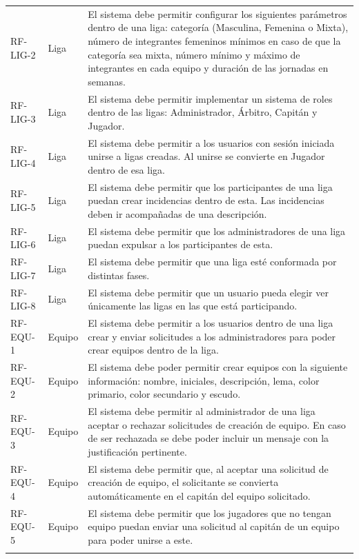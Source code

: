 {\begin{xltabular}{\textwidth}{>{\RaggedRight}p{1.7cm} p{1.8cm} >{\RaggedRight\arraybackslash}X}
        RF-LIG-2 & Liga & El sistema debe permitir configurar los siguientes parámetros dentro de una liga: categoría (Masculina, Femenina o Mixta), número de integrantes femeninos mínimos en caso de que la categoría sea mixta, número mínimo y máximo de integrantes en cada equipo y duración de las jornadas en semanas. \\ \lightrule
        RF-LIG-3 & Liga & El sistema debe permitir implementar un sistema de roles dentro de las ligas: Administrador, Árbitro, Capitán y Jugador. \\ \lightrule
        RF-LIG-4 & Liga & El sistema debe permitir a los usuarios con sesión iniciada unirse a ligas creadas. Al unirse se convierte en Jugador dentro de esa liga. \\ \lightrule
        RF-LIG-5 & Liga & El sistema debe permitir que los participantes de una liga puedan crear incidencias dentro de esta. Las incidencias deben ir acompañadas de una descripción. \\ \lightrule
        RF-LIG-6 & Liga & El sistema debe permitir que los administradores de una liga puedan expulsar a los participantes de esta. \\ \lightrule
        RF-LIG-7 & Liga & El sistema debe permitir que una liga esté conformada por distintas fases. \\ \lightrule
        RF-LIG-8 & Liga & El sistema debe permitir que un usuario pueda elegir ver únicamente las ligas en las que está participando. \\ \lightrule
        RF-EQU-1 & Equipo & El sistema debe permitir a los usuarios dentro de una liga crear y enviar solicitudes a los administradores para poder crear equipos dentro de la liga. \\ \lightrule
        RF-EQU-2 & Equipo & El sistema debe poder permitir crear equipos con la siguiente información: nombre, iniciales, descripción, lema, color primario, color secundario y escudo. \\ \lightrule
        RF-EQU-3 & Equipo & El sistema debe permitir al administrador de una liga aceptar o rechazar solicitudes de creación de equipo. En caso de ser rechazada se debe poder incluir un mensaje con la justificación pertinente. \\ \lightrule
        RF-EQU-4 & Equipo & El sistema debe permitir que, al aceptar una solicitud de creación de equipo, el solicitante se convierta automáticamente en el capitán del equipo solicitado. \\ \lightrule
        RF-EQU-5 & Equipo & El sistema debe permitir que los jugadores que no tengan equipo puedan enviar una solicitud al capitán de un equipo para poder unirse a este. \\ \lightrule

\end{xltabular}}

